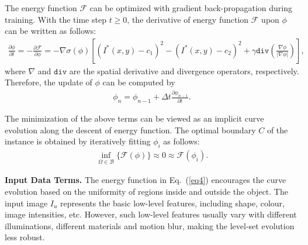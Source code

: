 \documentclass[12pt,onecolumn,letterpaper]{article}
\begin{document}
The energy function $\mathcal{F}$ can be optimized with  gradient back-propagation during training. With the time step $t \geqslant 0$, the derivative of energy function $\mathcal{F}$ upon $\phi$ can be written as follows:
\begin{equation} \label{eq7}
	\begin{aligned}
		\frac{{\partial \phi }}{{\partial t}} =  - \frac{{\partial \mathcal{F}}}{{\partial \phi }}  =  - \nabla \sigma (\phi )[ {({I^*}(x,y) - c_1)^2} - {({I^*}(x,y) - c_2)^2} + \gamma \texttt{div}\left (\frac{{\nabla \phi }}{{\left| {\nabla \phi } \right|}}\right)],
	\end{aligned}
\end{equation}
where $\nabla$ and $\texttt{div}$ are the spatial derivative and  divergence operators, respectively. Therefore, the update of $\phi$ can be computed by
\begin{equation} \label{eq9}
	\begin{aligned}
		{\phi _n} = {\phi _{n - 1}} + \Delta t\frac{{\partial \phi_{n-1} }}{{\partial t}}.
	\end{aligned}
\end{equation}

The minimization of the above terms can be viewed as an implicit curve evolution along the descent of energy function. The optimal boundary $C$ of the instance is obtained by iteratively fitting $\phi _i$ as follows:
\begin{equation} \label{eq10}
	\begin{aligned}
		\mathop {\inf }\limits_{\Omega \in \mathcal{B}} \{ \mathcal{F}(\phi)\}  \approx 0 \approx \mathcal{F}({\phi_{i}}).
	\end{aligned}
\end{equation}

\textbf{Input Data Terms.} The energy function in Eq.~(\ref{eq4}) encourages the curve evolution based on the uniformity of regions inside and outside the object. The input image $I_u$ represents the basic low-level features, including shape, colour, image intensities, etc. However, such low-level features usually vary with different illuminations, different materials and motion blur, making the level-set evolution less robust.
\end{document}
